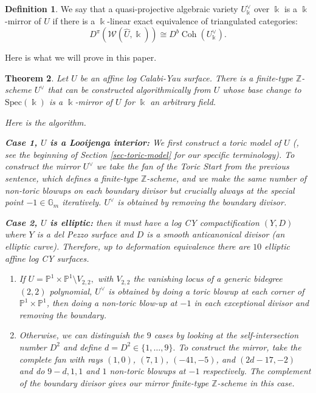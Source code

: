\documentclass[11pt, reqno]{amsart}
\newtheorem{theorem}{Theorem}[section]
\theoremstyle{definition}
\newtheorem{definition}[theorem]{Definition}
\begin{document}
\begin{definition}
    We say that a quasi-projective algebraic variety $U_\Bbbk^\vee$ over $\Bbbk$ is a $\Bbbk$-mirror of ${U}$ if there is a $\Bbbk$-linear exact equivalence of triangulated categories:
\[ D^\pi(\mathcal{W}(\widehat{U},\Bbbk)) \cong D^b \operatorname{Coh}(U^\vee_\Bbbk). \]
\end{definition}

Here is what we will prove in this paper.

\begin{theorem}\label{thm-main} Let $U$ be an affine log Calabi-Yau surface.
    There is a finite-type $\mathbb{Z}$-scheme $U^\vee$ that can be constructed algorithmically from $U$ whose base change to $\mathrm{Spec}(\Bbbk)$  is a $\Bbbk$-mirror of $U$ for $\Bbbk$ an arbitrary field.

Here is the algorithm.

\textbf{Case 1, $U$ is a Looijenga interior:} We first construct a toric model of $U$ (\cite{GHK15}, see the beginning of Section \ref{sec-toric-model} for our specific terminology). To construct the mirror $U^\vee$ we take the fan of the Toric Start from the previous sentence, which defines a finite-type $\mathbb{Z}$-scheme, and we make the same number of non-toric blowups on each boundary divisor but crucially always at the special point $-1\in\mathbb{G}_m$ iteratively. $U^\vee$ is obtained by removing the boundary divisor. 

\textbf{Case 2, $U$ is elliptic:} then it must have a log CY compactification $(Y,D)$ where $Y$ is a del Pezzo surface and $D$ is a smooth anticanonical divisor (an elliptic curve). Therefore, up to deformation equivalence there are $10$ elliptic affine log CY surfaces. 
\begin{enumerate}
    \item If $U= \mathbb{P}^1\times \mathbb{P}^1\setminus V_{2,2},$ with $V_{2,2}$ the vanishing locus of a generic bidegree $(2,2)$ polynomial, $U^\vee$ is obtained by doing a toric blowup at each corner of  $\mathbb{P}^1\times \mathbb{P}^1$, then doing a non-toric blow-up at $-1$ in each exceptional divisor and removing the boundary.
    \item Otherwise, we can distinguish the $9$ cases by looking at the self-intersection number $D^2$ and define $d=D^2\in \{1,\ldots,9\}.$ To construct the mirror, take the complete fan with rays  $(1, 0)$, $(7, 1)$, $(-41, -5)$, and $(2d - 17, -2)$ and do $9-d,1,1$ and $1$ non-toric blowups at $-1$ respectively. The complement of the boundary divisor gives our mirror finite-type $\mathbb{Z}$-scheme in this case. 
\end{enumerate}




\end{theorem}
\end{document}
